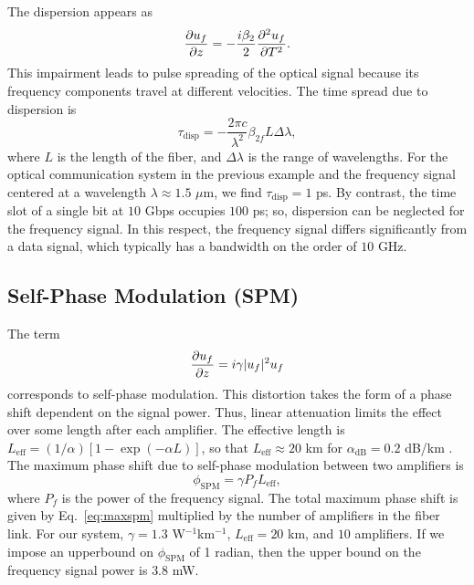The dispersion appears as
%
\begin{equation}
\frac{\partial u_f}{\partial z} = -\frac{i\beta_{2}}{2}\frac{\partial ^2u_f}{\partial T^2}.
\end{equation}
%
This impairment leads to pulse spreading of the optical signal because its frequency components travel at different velocities. The time spread due to dispersion is \cite{agrawal2012fiber}
%
\begin{equation}
\tau_{\text{disp}} = -\frac{2\pi c}{\lambda^2}\beta_{2f} L\Delta \lambda,
\end{equation}
%
where $L$ is the length of the fiber, and $\Delta\lambda$ is the range of wavelengths. For the optical communication system in the previous example and the frequency signal centered at a wavelength $\lambda \approx 1.5$ $\mu$m, we find $\tau_{\text{disp}} = 1$ ps. By contrast, the time slot of a single bit at $10$ Gbps occupies $100$ ps; so, dispersion can be neglected for the frequency signal. In this respect, the frequency signal differs significantly from a data signal, which typically has a bandwidth on the order of $10$ GHz.


\subsection{Self-Phase Modulation (SPM)}

The term
\begin{equation}
\frac{\partial u_f}{\partial z} = i\gamma|u_f|^2u_f
\end{equation}
corresponds to self-phase modulation. This distortion takes the form of a phase shift dependent on the signal power. Thus, linear attenuation limits the effect over some length after each amplifier. The effective length is $L_{\text{eff}} = (1/\alpha)[1-\exp(-\alpha L)]$, so that $L_{\text{eff}} \approx 20$ km for $\alpha_{\text{dB}} = 0.2$ dB/km \cite{Agrawal2013}. The maximum phase shift due to self-phase modulation between two amplifiers is \cite{Agrawal2013}
%
\begin{equation} \label{eq:maxspm}
\phi_{\text{SPM}} = \gamma P_f L_{\text{eff}},
\end{equation}
%
where $P_f$ is the power of the frequency signal. The total maximum phase shift is given by Eq.~\ref{eq:maxspm} multiplied by the number of amplifiers in the fiber link. For our system, $\gamma = 1.3$ W$^{-1}$km$^{-1}$, $L_{\text{eff}} = 20$ km, and $10$ amplifiers. If we impose an upperbound on $\phi_{\text{SPM}}$ of 1 radian, then the upper bound on the frequency signal power is $3.8$ mW.

